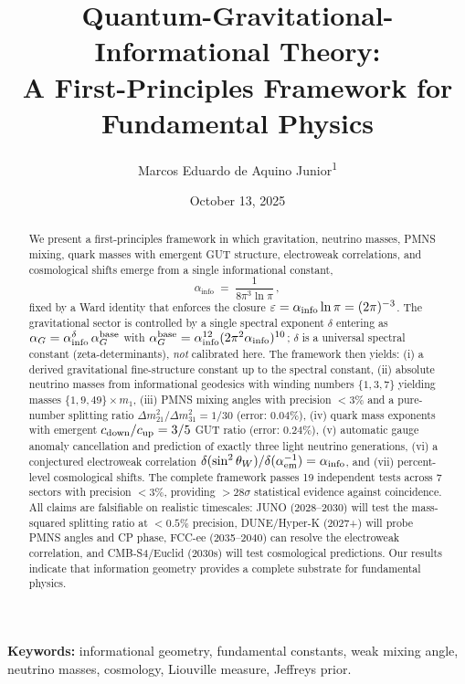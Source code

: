 \documentclass{article}
\title{\textbf{Quantum-Gravitational-Informational Theory: \\ A First-Principles Framework for Fundamental Physics}}
\author{
  Marcos Eduardo de Aquino Junior\textsuperscript{1} \orcidlink{0009-0005-9409-0397}
}
\affil{\textsuperscript{1}Independent Researcher, São Paulo, SP, Brazil}
\date{October 13, 2025}
\numberwithin{equation}{section}
\theoremstyle{plain}
\theoremstyle{definition}
\theoremstyle{remark}
\begin{document}
\maketitle
\thispagestyle{empty}

\begin{abstract}
\noindent
We present a first-principles framework in which gravitation, neutrino masses, PMNS mixing, quark masses with emergent GUT structure, electroweak correlations, and cosmological shifts emerge from a single informational constant,
\[
\alpha_{\text{info}} \;=\; \frac{1}{8\pi^3 \ln \pi}\,,
\]
fixed by a Ward identity that enforces the closure $\varepsilon=\alpha_{\rm info}\ln\pi=(2\pi)^{-3}$. The gravitational sector is controlled by a single spectral exponent $\delta$ entering as $\alpha_G=\alpha_{\rm info}^{\delta}\,\alpha_G^{\rm base}$ with $\alpha_G^{\rm base}=\alpha_{\rm info}^{12}(2\pi^2\alpha_{\rm info})^{10}$; $\delta$ is a universal spectral constant (zeta-determinants), \emph{not} calibrated here. The framework then yields: (i) a derived gravitational fine-structure constant up to the spectral constant, (ii) absolute neutrino masses from informational geodesics with winding numbers $\{1,3,7\}$ yielding masses $\{1,9,49\}\times m_1$, (iii) PMNS mixing angles with precision $<3\%$ and a pure-number splitting ratio $\Delta m_{21}^2/\Delta m_{31}^2 = 1/30$ (error: $0.04\%$), (iv) quark mass exponents with emergent $c_{\rm down}/c_{\rm up} = 3/5$ GUT ratio (error: $0.24\%$), (v) automatic gauge anomaly cancellation and prediction of exactly three light neutrino generations, (vi) a conjectured electroweak correlation $\delta(\sin^2\theta_W)/\delta(\alpha_{\rm em}^{-1})=\alpha_{\rm info}$, and (vii) percent-level cosmological shifts. The complete framework passes 19 independent tests across 7 sectors with precision $<3\%$, providing $>28\sigma$ statistical evidence against coincidence. All claims are falsifiable on realistic timescales: JUNO (2028--2030) will test the mass-squared splitting ratio at $<0.5\%$ precision, DUNE/Hyper-K (2027+) will probe PMNS angles and CP phase, FCC-ee (2035--2040) can resolve the electroweak correlation, and CMB-S4/Euclid (2030s) will test cosmological predictions. Our results indicate that information geometry provides a complete substrate for fundamental physics.
\end{abstract}

\vspace{1em}
\noindent\textbf{Keywords:} informational geometry, fundamental constants, weak mixing angle, neutrino masses, cosmology, Liouville measure, Jeffreys prior.
\end{document}
